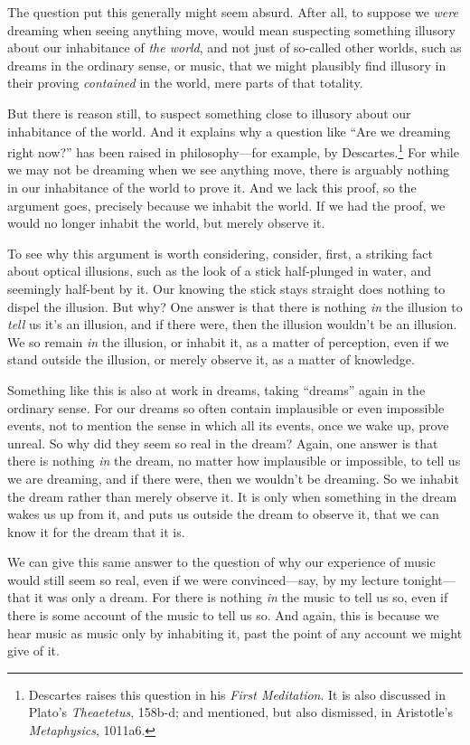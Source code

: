 \documentclass[12pt]{memoir}
\begin{document}
The question put this generally might seem absurd.
After all, to suppose we \emph{were} dreaming
when seeing anything move, would mean suspecting
something illusory about our inhabitance of
\emph{the world}, and not just of so-called other
worlds, such as dreams in the ordinary sense, or
music, that we might plausibly find illusory in
their proving \emph{contained} in the world, mere
parts of that totality.

But there is reason still, to suspect something
close to illusory about our inhabitance
of the world. And it explains why a question
like ``Are we dreaming right now?'' has
been raised in philosophy---for example, by
Descartes.\footnote{Descartes raises this question
in his \emph{First Meditation}. It is also
discussed in Plato's \emph{Theaetetus}, 158b-d;
and mentioned, but also dismissed, in Aristotle's
\emph{Metaphysics}, 1011a6.} For while we may
not be dreaming when we see anything move, there
is arguably nothing in our inhabitance of the
world to prove it. And we lack this proof, so the
argument goes, precisely because we inhabit the
world. If we had the proof, we would no longer
inhabit the world, but merely observe it.

To see why this argument is worth considering,
consider, first, a striking fact about optical
illusions, such as the look of a stick
half-plunged in water, and seemingly half-bent
by it. Our knowing the stick stays straight does
nothing to dispel the illusion. But why? One
answer is that there is nothing \emph{in} the
illusion to \emph{tell} us it's an illusion, and
if there were, then the illusion wouldn't be an
illusion. We so remain \emph{in} the illusion, or
inhabit it, as a matter of perception, even if we
stand outside the illusion, or merely observe it,
as a matter of knowledge.

Something like this is also at work in dreams,
taking ``dreams'' again in the ordinary sense.
For our dreams so often contain implausible or
even impossible events, not to mention the sense
in which all its events, once we wake up, prove
unreal. So why did they seem so real in the
dream? Again, one answer is that there is nothing
\emph{in} the dream, no matter how implausible or
impossible, to tell us we are dreaming, and if
there were, then we wouldn't be dreaming. So we
inhabit the dream rather than merely observe it.
It is only when something in the dream wakes us up
from it, and puts us outside the dream to observe
it, that we can know it for the dream that it is.

We can give this same answer to the question of
why our experience of music would still seem so
real, even if we were convinced---say, by my
lecture tonight---that it was only a dream. For
there is nothing \emph{in} the music to tell us
so, even if there is some account of the music to
tell us so. And again, this is because we hear
music as music only by inhabiting it, past the
point of any account we might give of it.
\end{document}
